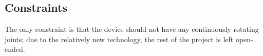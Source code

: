 \subsection{Constraints}

The only constraint is that the device should not have any continuously rotating joints; due to the relatively new technology, the rest of the project is left open-ended.